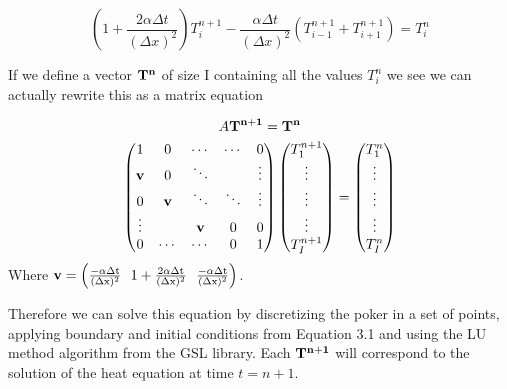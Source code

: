\documentclass[10 pt]{article}
\numberwithin{equation}{section}
\begin{document}
\begin{multicols}{2}
\begin{equation}
\left ( 1 + \frac{2 \alpha \Delta t}{(\Delta x)^2} \right ) T_i^{n+1} - \frac{\alpha \Delta t}{(\Delta x)^2} ( T_{i-1}^{n+1} + T_{i+1}^{n+1} ) = T_i^n
\end{equation}

If we define a vector $\bf T^n$ of size I containing all the values $T_i^n$ we see we can actually rewrite this as a matrix equation

\begin{equation}
\begin{gathered}
A \bf T^{n+1} \rm = \bf T^n\\
\rm \begin{pmatrix}
1 & 0 & \cdots & \cdots & 0\\
\bf v & 0 & \ddots & & \vdots \\
0 & \bf v & \ddots & \ddots & \vdots\\
\vdots & & \bf v & 0 & 0\\
0 & \cdots & \cdots & 0 & 1
\end{pmatrix}
\begin{pmatrix}
T_1^{n+1}\\
\vdots\\
\vdots\\
\vdots\\
T_I^{n+1}
\end{pmatrix}
=
\begin{pmatrix}
T_1^{n}\\
\vdots\\
\vdots\\
\vdots\\
T_I^{n}
\end{pmatrix}
\end{gathered}
\end{equation}
Where $\bf v \rm = \left ( \frac{-\alpha \Delta t}{(\Delta x)^2} \ \ 1 + \frac{2\alpha \Delta t}{(\Delta x)^2} \ \ \frac{-\alpha \Delta t}{(\Delta x)^2} \right )$.

Therefore we can solve this equation by discretizing the poker in a set of points, applying boundary and initial conditions from Equation 3.1 and using the LU method algorithm from the GSL library\cite{GSL}. Each $\bf T^{n+1}$ will correspond to the solution of the heat equation at time $t = n+1$.
\end{multicols}
\end{document}
